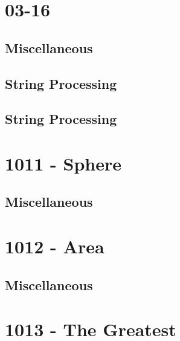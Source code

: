 \section{03-16}
\subsection{Miscellaneous}
\raggedbottom
\vspace{-.7\baselineskip}\hrulefill
\vspace{0.1\baselineskip}\subsection{String Processing}
\raggedbottom
\vspace{-.7\baselineskip}\hrulefill
\vspace{0.1\baselineskip}\subsection{String Processing}
\raggedbottom
\vspace{-.7\baselineskip}\hrulefill
\vspace{0.1\baselineskip}
\section{1011 - Sphere}
\subsection{Miscellaneous}
\raggedbottom
\vspace{-.7\baselineskip}\hrulefill
\vspace{0.1\baselineskip}
\section{1012 - Area}
\subsection{Miscellaneous}
\raggedbottom
\vspace{-.7\baselineskip}\hrulefill
\vspace{0.1\baselineskip}
\section{1013 - The Greatest}
